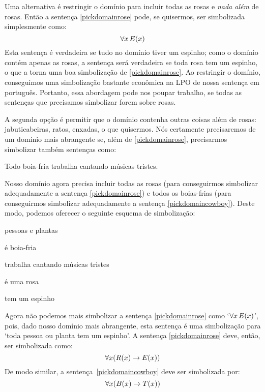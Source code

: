Uma alternativa é restringir o domínio para incluir todas as rosas e \emph{nada além} de rosas.
Então a sentença \ref{pickdomainrose} pode, se quisermos, ser simbolizada simplesmente como:
$$\forall x\,\mathord{E}(x)$$
Esta sentença é verdadeira se tudo no domínio tiver um espinho; como o domínio contém apenas as rosas, a sentença será verdadeira se toda rosa tem um espinho, o que a torna uma boa simbolização de \ref{pickdomainrose}.
Ao restringir o domínio, conseguimos uma simbolização bastante econômica na LPO de nossa sentença em português.
Portanto, essa abordagem pode nos poupar trabalho, se todas as sentenças que precisamos simbolizar forem sobre rosas.

A segunda opção é permitir que o domínio contenha outras coisas além de rosas: jabuticabeiras, ratos, enxadas, o que quisermos.
Nós certamente precisaremos de um domínio mais abrangente se, além de \ref{pickdomainrose}, precisarmos simbolizar também sentenças como:
	\begin{earg}
		\item[\ex{pickdomaincowboy}] Todo boia-fria trabalha cantando músicas tristes.
	\end{earg}
Nosso domínio agora precisa incluir todas as rosas (para conseguirmos simbolizar adequadamente a sentença \ref{pickdomainrose}) e todos os boias-frias (para conseguirmos simbolizar adequadamente a sentença \ref{pickdomaincowboy}). Deste modo, podemos oferecer o seguinte esquema de simbolização:
	\begin{center}
	\begin{ekey}
		\item[\text{domínio}] pessoas e plantas
		\item[\atom{B}{x}]  é boia-fria
		\item[\atom{T}{x}]  trabalha cantando músicas tristes
		\item[\atom{R}{x}]  é uma rosa
		\item[\atom{E}{x}]  tem um espinho
	\end{ekey}
	\end{center}
Agora não podemos mais simbolizar a sentença \ref{pickdomainrose} como `$\forall x\, \mathord{E}(x)$', pois, dado nosso domínio mais abrangente, esta sentença é uma simbolização para `toda pessoa ou planta tem um espinho'.
A sentença \ref{pickdomainrose} deve, então, ser simbolizada como:
$$\forall x (\mathord{R}(x) \rightarrow \mathord{E}(x))$$
De modo similar, a sentença~\ref{pickdomaincowboy} deve ser simbolizada por:
$$\forall x (\mathord{B}(x) \rightarrow \mathord{T}(x))$$

